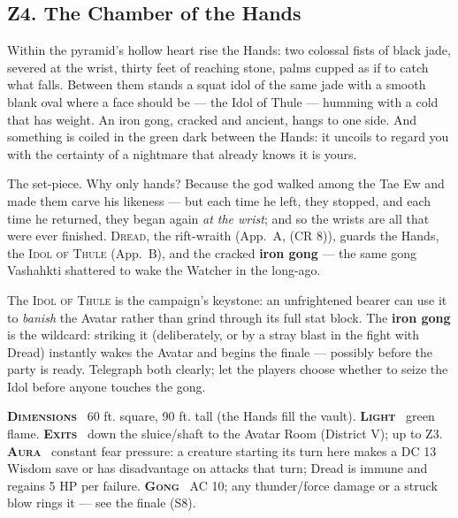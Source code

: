 \documentclass[10pt,twoside]{article}
\newcommand{\tech}[1]{\textbf{\scshape\textcolor{stone}{#1}}\ }
\newcommand{\CR}[1]{\textnormal{(CR #1)}}
\newcommand{\eqname}[1]{\textsc{#1}}
\begin{document}
\subsection{Z4. The Chamber of the Hands}
\begin{readaloud}
Within the pyramid's hollow heart rise the Hands: two colossal fists of black jade,
severed at the wrist, thirty feet of reaching stone, palms cupped as if to catch what
falls. Between them stands a squat idol of the same jade with a smooth blank oval
where a face should be --- the Idol of Thule --- humming with a cold that has weight.
An iron gong, cracked and ancient, hangs to one side. And something is coiled in the
green dark between the Hands: it uncoils to regard you with the certainty of a
nightmare that already knows it is yours.
\end{readaloud}
The set-piece. Why only hands? Because the god walked among the Tae Ew and made them
carve his likeness --- but each time he left, they stopped, and each time he returned,
they began again \emph{at the wrist}; and so the wrists are all that were ever
finished. \eqname{Dread}, the rift-wraith (App.\ A, \CR{8}), guards the Hands, the
\eqname{Idol of Thule} (App.\ B), and the cracked \textbf{iron gong} --- the same
gong Vashahkti shattered to wake the Watcher in the long-ago.

\begin{dmnote}
The \eqname{Idol of Thule} is the campaign's keystone: an unfrightened bearer can use
it to \emph{banish} the Avatar rather than grind through its full stat block. The
\textbf{iron gong} is the wildcard: striking it (deliberately, or by a stray blast in
the fight with Dread) instantly wakes the Avatar and begins the finale --- possibly
before the party is ready. Telegraph both clearly; let the players choose whether to
seize the Idol before anyone touches the gong.
\end{dmnote}

\begin{techbox}
\tech{Dimensions} 60 ft. square, 90 ft. tall (the Hands fill the vault). \tech{Light}
green flame. \tech{Exits} down the sluice/shaft to the Avatar Room (District V);
up to Z3. \tech{Aura} constant fear pressure: a creature starting its turn here makes
a DC 13 Wisdom save or has disadvantage on attacks that turn; Dread is immune and
regains 5 HP per failure. \tech{Gong} AC 10; any thunder/force damage or a struck
blow rings it --- see the finale (S8).
\end{techbox}
\clearpage
\end{document}
